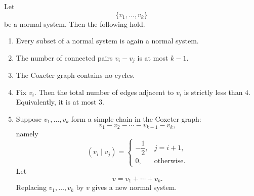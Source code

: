 \begin{proposition}
    Let
    \[
        \{v_1,\dots,v_k\}
    \]
    be a normal system. Then the following hold.
    \begin{enumerate}
        \item Every subset of a normal system is again a normal system.

        \item The number of connected pairs \(v_i-v_j\) is at most \(k-1\).

        \item The Coxeter graph contains no cycles.

        \item Fix \(v_i\). Then the total number of edges adjacent to \(v_i\) is
              strictly less than \(4\). Equivalently, it is at most \(3\).

        \item Suppose \(v_1,\dots,v_k\) form a simple chain in the Coxeter graph:
              \[
                  v_1 - v_2 - \cdots - v_{k-1}-v_k,
              \]
              namely
              \[
                  (v_i\mid v_j)=
                  \begin{cases}
                      -\dfrac{1}{2}, & j=i+1,            \\[4pt]
                      0,             & \text{otherwise}.
                  \end{cases}
              \]
              Let
              \[
                  v=v_1+\cdots+v_k.
              \]
              Replacing \(v_1,\dots,v_k\) by \(v\) gives a new normal system.
    \end{enumerate}
\end{proposition}

